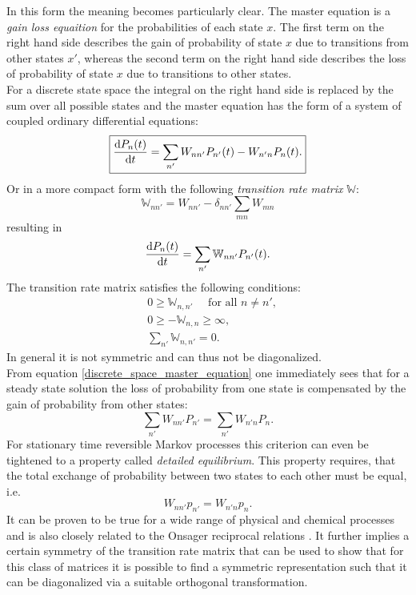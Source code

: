 In this form the meaning becomes particularly clear. The master equation is a \textit{gain loss equaition} for the probabilities of each state $x$. The first term on the right hand side describes the gain of probability of state $x$ due to transitions from other states $x'$, whereas the second term on the right hand side describes the loss of probability of state $x$ due to transitions to other states.\\
For a discrete state space the integral on the right hand side is replaced by the sum over all possible states and the master equation has the form of a system of coupled ordinary differential equations:
\begin{equation}
    \boxed{\frac{{\rm d} P_n(t)}{{\rm d} t} = \sum_{n'} W_{n n'}P_{n'}(t) - W_{n'n}P_{n}(t).}
    \label{discrete_space_master_equation}
\end{equation}
Or in a more compact form with the following \emph{transition rate matrix} $\mathbb{W}$:
\begin{equation}
    \mathbb{W}_{n n'} = W_{n n'} - \delta_{n n'}\sum\limits_{m n} W_{m n}
    \label{transition_rate_matrix}
\end{equation}
resulting in 
\begin{equation}
    \frac{{\rm d} P_n(t)}{{\rm d} t} = \sum_{n'} \mathbb{W}_{n n'}P_{n'}(t).
    \label{ME3}
\end{equation}
The transition rate matrix satisfies the following conditions:
\begin{align*}
    &0 \ge \mathbb{W}_{n,n'} \quad \mbox{ for all } n \ne n', \\
    &0 \ge -\mathbb{W}_{n,n} \ge \infty, \\
    &\sum_{n'} \mathbb{W}_{n,n'} = 0.
    \label{Transitions_rate_matrix}
\end{align*}
In general it is not symmetric and can thus not be diagonalized. \\
From equation \eqref{discrete_space_master_equation} one immediately sees that for a steady state solution the loss of probability from one state is compensated by the gain of probability from other states:\\
\begin{equation}
    \sum\limits_{n'} W_{n n'}P_{n'} = \sum\limits_{n'}W_{n' n} P_n.
    \label{equilibrium}
\end{equation}
For stationary time reversible Markov processes this criterion can even be tightened to a property called \textit{detailed equilibrium}.
This property requires, that the total exchange of probability between two states to each other must be equal, i.e.
\begin{equation}
   \boxed{ W_{n n'}p_{n'} = W_{n'n}p_{n}.}
    \label{detailed_balance}
\end{equation}
It can be proven to be true for a wide range of physical and chemical processes \cite{Boltzmann1872,Einstein1917,Wegscheider1911} and is also closely related to the Onsager reciprocal relations \cite{Onsager1931,Wigner1954}.
It further implies a certain symmetry of the transition rate matrix that can be used to show that for this class of matrices it is possible to find a symmetric representation such that it can be diagonalized via a suitable orthogonal transformation\cite{Oppenheim1977}.
